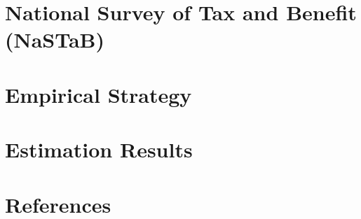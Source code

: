 \documentclass[
  11pt,
  a4paper,
]{article}
\begin{document}
\hypertarget{nastab}{%
\section{National Survey of Tax and Benefit (NaSTaB)}\label{nastab}}

\hypertarget{estimation}{%
\section{Empirical Strategy}\label{estimation}}

\hypertarget{result}{%
\section{Estimation Results}\label{result}}

\hypertarget{references}{%
\section*{References}\label{references}}
\end{document}
